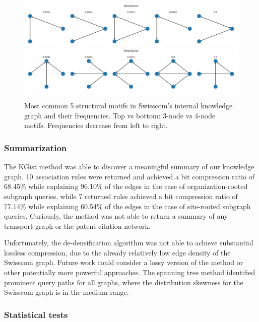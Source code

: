 \begin{figure}[H]
    \centering
    \includegraphics[width=\textwidth]{figures/swisscom/3motifs.png}
    \includegraphics[width=\textwidth]{figures/swisscom/4motifs.png}
    \caption[Most common 5 structural motifs in Swisscom's internal knowledge graph and their frequencies.]{Most common 5 structural motifs in Swisscom's internal knowledge graph and their frequencies. Top vs bottom: 3-node vs 4-node motifs. Frequencies decrease from left to right.}
    \label{fig:motifs}
\end{figure}

\subsubsection{Summarization}

The KGist method was able to discover a meaningful summary of our knowledge graph. 10 association rules were returned and achieved a bit compression ratio of 68.45\% while explaining 96.10\% of the edges in the case of organization-rooted subgraph queries, while 7 returned rules achieved a bit compression ratio of 77.14\% while explaining 60.54\% of the edges in the case of site-rooted subgraph queries. Curiously, the method was not able to return a summary of any transport graph or the patent citation network. 

Unfortunately, the de-densification algorithm was not able to achieve substantial lossless compression, due to the already relatively low edge density of the Swisscom graph. Future work could consider a lossy version of the method or other potentially more powerful approaches. The spanning tree method identified prominent query paths for all graphs, where the distribution skewness for the Swisscom graph is in the medium range.

\subsubsection{Statistical tests}

